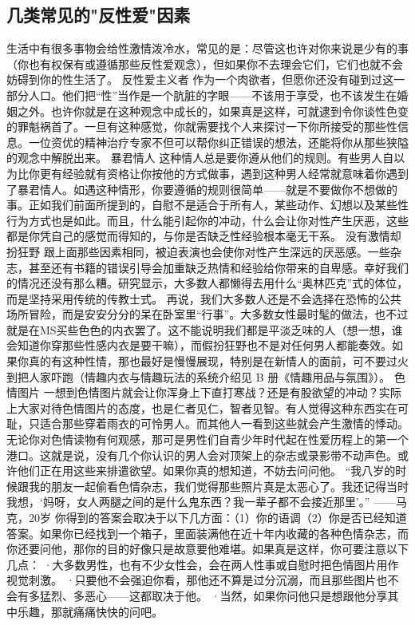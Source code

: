 \documentclass[12pt,UTF8,openany]{ctexbook}
\begin{document}
\subsection*{几类常见的"反性爱"因素}
生活中有很多事物会给性激情泼冷水，常见的是：尽管这也许对你来说是少有的事（你也有权保有或遵循那些反性爱观念），但如果你不去理会它们，它们也就不会妨碍到你的性生活了。
反性爱主义者
作为一个肉欲者，但愿你还没有碰到过这一部分人口。他们把“性”当作是一个肮脏的字眼——不该用于享受，也不该发生在婚姻之外。也许你就是在这种观念中成长的，如果真是这样，可就逮到令你谈性色变的罪魁祸首了。一旦有这种感觉，你就需要找个人来探讨一下你所接受的那些性信息。一位资优的精神治疗专家不但可以帮你纠正错误的想法，还能将你从那些狭隘的观念中解脱出来。
暴君情人
这种情人总是要你遵从他们的规则。有些男人自以为比你更有经验就有资格让你按他的方式做事，遇到这种男人经常就意味着你遇到了暴君情人。如遇这种情形，你要遵循的规则很简单——就是不要做你不想做的事。正如我们前面所提到的，自慰不是适合于所有人，某些动作、幻想以及某些性行为方式也是如此。而且，什么能引起你的冲动，什么会让你对性产生厌恶，这些都是你凭自己的感觉而得知的，与你是否缺乏性经验根本毫无干系。
没有激情却扮狂野
跟上面那些因素相同，被迫表演也会使你对性产生深远的厌恶感。一些杂志，甚至还有书籍的错误引导会加重缺乏热情和经验给你带来的自卑感。幸好我们的情况还没有那么糟。研究显示，大多数人都懒得去用什么“奥林匹克”式的体位，而是坚持采用传统的传教士式。
再说，我们大多数人还是不会选择在恐怖的公共场所冒险，而是安安分分的呆在卧室里“行事”。大多数女性最时髦的做法，也不过就是在MS买些色色的内衣罢了。这不能说明我们都是平淡乏味的人（想一想，谁会知道你穿那些性感内衣是要干嘛），而假扮狂野也不是对任何男人都能奏效。如果你真的有这种性情，那也最好是慢慢展现，特别是在新情人的面前，可不要过火到把人家吓跑（情趣内衣与情趣玩法的系统介绍见 B 册《情趣用品与氛围》）。
色情图片
一想到色情图片就会让你浑身上下直打寒战？还是有股欲望的冲动？实际上大家对待色情图片的态度，也是仁者见仁，智者见智。有人觉得这种东西实在可耻，只适合那些穿着雨衣的可怜男人。而其他人一看到这些就会产生激情的悸动。无论你对色情读物有何观感，那可是男性们自青少年时代起在性爱历程上的第一个港口。这就是说，没有几个你认识的男人会对顶架上的杂志或录影带不动声色。或许他们正在用这些来排遣欲望。如果你真的想知道，不妨去问问他。
“我八岁的时候跟我的朋友一起偷看色情杂志，我们觉得那些照片真是太恶心了。我还记得当时我想，‘妈呀，女人两腿之间的是什么鬼东西？我一辈子都不会接近那里’。”
——马克，20岁
你得到的答案会取决于以下几方面：（1）你的语调（2）你是否已经知道答案。如果你已经找到一个箱子，里面装满他在近十年内收藏的各种色情杂志，而你还要问他，那你的目的好像只是故意要他难堪。如果真是这样，你可要注意以下几点：
·大多数男性，也有不少女性会，会在两人性事或自慰时把色情图片用作视觉刺激。
·只要他不会强迫你看，那他还不算是过分沉溺，而且那些图片也不会有多猛烈、多恶心——这都取决于他。
·当然，如果你问他只是想跟他分享其中乐趣，那就痛痛快快的问吧。
\end{document}
